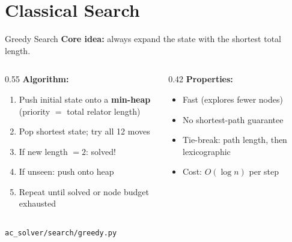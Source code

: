 \documentclass[aspectratio=169,11pt]{beamer}
\begin{document}
\section{Classical Search}

\begin{frame}{Greedy Search}
  \textbf{Core idea:} always expand the state with the \alert{shortest total length}.

  \begin{columns}[T]
    \begin{column}{0.55\textwidth}
      \textbf{Algorithm:}
      \begin{enumerate}
        \item Push initial state onto a \textbf{min-heap}\\
              (priority $=$ total relator length)
        \item Pop shortest state; try all 12 moves
        \item If new length $= 2$: \textcolor{good}{solved!}
        \item If unseen: push onto heap
        \item Repeat until solved or node budget exhausted
      \end{enumerate}
    \end{column}
    \begin{column}{0.42\textwidth}
      \textbf{Properties:}
      \begin{itemize}
        \item[\textcolor{good}{\checkmark}] Fast (explores fewer nodes)
        \item[\textcolor{bad}{$\times$}] No shortest-path guarantee
        \item Tie-break: path length, then lexicographic
        \item Cost: $O(\log n)$ per step
      \end{itemize}
    \end{column}
  \end{columns}

  \bigskip
  \footnotesize\texttt{ac\_solver/search/greedy.py}
\end{frame}
\end{document}
